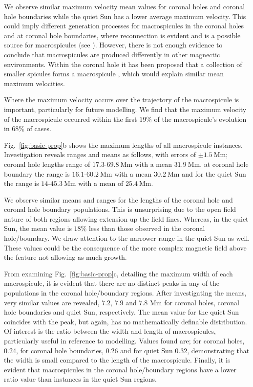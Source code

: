 We observe similar maximum velocity mean values for coronal holes and coronal hole boundaries while the quiet Sun has a lower average maximum velocity. This could imply different generation processes for macrospicules in the coronal holes and at coronal hole boundaries, where reconnection is evident \cite{Patsourakos1999} and is a possible source for macrospicules (see \cite{Heggland2009}). However, there is not enough evidence to conclude that macrospicules are produced differently in other magnectic environments. Within the coronal hole it has been proposed that a collection of smaller spicules forms a macrospicule \cite{Scullion2009}, which would explain similar mean maximum velocities.

Where the maximum velocity occurs over the trajectory of the macrospicule is important, particularly for future modelling. We find that the maximum velocity of the macrospicule occurred within the first $19\%$ of the macrospicule's evolution in $68\%$ of cases.

Fig.~\ref{fig:basic-prop}b shows the maximum lengths of all macrospicule instances. Investigation reveals ranges and means as follows, with errors of $\pm1.5\ \textrm{Mm}$; coronal hole lengths range of $17.3$-$69.8\ \textrm{Mm}$ with a mean $31.9\ \textrm{Mm}$, at coronal hole boundary the range is $16.1$-$60.2\ \textrm{Mm}$ with a mean $30.2\ \textrm{Mm}$ and for the quiet Sun the range is $14$-$45.3\ \textrm{Mm}$ with a mean of $25.4\ \textrm{Mm}$. 

We observe similar means and ranges for the lengths of the coronal hole and coronal hole boundary populations. This is unsurprising due to the open field nature of both regions allowing extension up the field lines. Whereas, in the quiet Sun, the mean value is $18\%$ less than those observed in the coronal hole/boundary. We draw attention to the narrower range in the quiet Sun as well. These values could be the consequence of the more complex magnetic field above the feature not allowing as much growth. 

From examining Fig.~\ref{fig:basic-prop}c, detailing the maximum width of each macrospicule, it is evident that there are no distinct peaks in any of the populations in the coronal hole/boundary regions. After investigating the means, very similar values are revealed, $7.2$, $7.9$ and $7.8$ Mm for coronal holes, coronal hole boundaries and quiet Sun, respectively. The mean value for the quiet Sun coincides with the peak, but again, has no mathematically definable distribution. Of interest is the ratio between the width and length of macrospicules, particularly useful in reference to modelling. Values found are; for coronal holes, $0.24$, for coronal hole boundaries, $0.26$ and for quiet Sun $0.32$, demonstrating that the width is small compared to the length of the macrospicule. Finally, it is evident that macrospicules in the coronal hole/boundary regions have a lower ratio value than instances in the quiet Sun regions.

